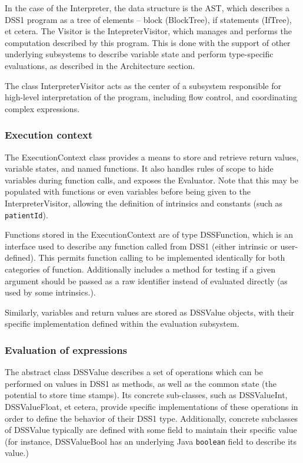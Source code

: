 \documentclass[12pt,letterpaper]{article}
\begin{document}
{	In the case of the Interpreter, the data structure is the AST, which describes a DSS1 program as a tree of elements – block (BlockTree), if statements (IfTree), et cetera. The Visitor is the IntepreterVisitor, which manages and performs the computation described by this program. This is done with the support of other underlying subsystems to describe variable state and perform type-specific evaluations, as described in the Architecture section.

	The class InterpreterVisitor acts as the center of a subsystem  responsible for high-level interpretation of the program, including flow control, and coordinating complex expressions.

\subsubsection{Execution context}

The ExecutionContext class provides a means to store and retrieve return values, variable states, and named functions. It also handles rules of scope to hide variables during function calls, and exposes the Evaluator. Note that this may be populated with functions or even variables before being given to the InterpreterVisitor, allowing the definition of intrinsics and constants (such as \texttt{patientId}).

Functions stored in the ExecutionContext are of type DSSFunction, which is an interface used to describe any function called from DSS1 (either intrinsic or user-defined). This permits function calling to be implemented identically for both categories of function. Additionally includes a method for testing if a given argument should be passed as a raw identifier instead of evaluated directly (as used by some intrinsics.).

Similarly, variables and return values are stored as DSSValue 
objects, with their specific implementation defined within the 
evaluation subsystem.

\subsubsection{Evaluation of expressions}

The abstract class DSSValue describes a set of operations which can be performed on values in DSS1 as methods, as well as the common state (the potential to store time stamps). Its concrete sub-classes, such as DSSValueInt, DSSValueFloat, et cetera, provide specific implementations of these operations in order to define the behavior of their DSS1 type. Additionally, concrete subclasses of DSSValue typically are defined with some field to maintain their specific value (for instance, DSSValueBool has an underlying Java \texttt{boolean} field to describe its value.)

}
\end{document}
